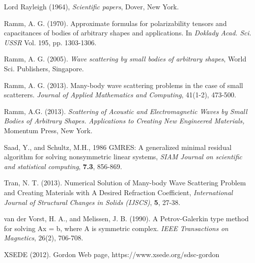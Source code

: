 \documentclass[12pt]{elsarticle}
\numberwithin{equation}{section}
\begin{document}
\begin{thebibliography}{0}
 Lord Rayleigh (1964), \textit{Scientific papers},  Dover, New York.

 Ramm, A. G. (1970). Approximate formulas for polarizability tensors and capacitances of bodies of arbitrary shapes and applications. In \textit{Doklady Acad. Sci. USSR} Vol. 195, pp. 1303-1306.

 Ramm, A. G. (2005). \textit{Wave scattering by small bodies of arbitrary shapes}, World Sci. Publishers, Singapore.

 Ramm, A. G. (2013). Many-body wave scattering problems in the case of small scatterers. \textit{Journal of Applied Mathematics and Computing}, 41(1-2), 473-500.

 Ramm, A.G. (2013). {\em Scattering of Acoustic and Electromagnetic Waves by Small Bodies of Arbitrary Shapes. Applications to Creating New Engineered Materials,} Momentum Press, New York.

 Saad, Y., and Schultz, M.H., 1986 GMRES: A generalized minimal residual algorithm for solving nonsymmetric linear systems, \textit{SIAM Journal on scientific and statistical computing}, \textbf{7.3}, 856-869.

 Tran, N. T. (2013). Numerical Solution of Many-body Wave Scattering Problem and Creating Materials with A Desired Refraction Coefficient, \textit{International Journal of Structural Changes in Solids (IJSCS)}, \textbf{5}, 27-38.

 van der Vorst, H. A., and Melissen, J. B. (1990). A Petrov-Galerkin type method for solving Ax = b, where A is symmetric complex. \textit{IEEE Transactions on Magnetics}, 26(2), 706-708.

 XSEDE (2012). {Gordon} {W}eb  page, https://www.xsede.org/sdsc-gordon
\end{thebibliography}
\end{document}
